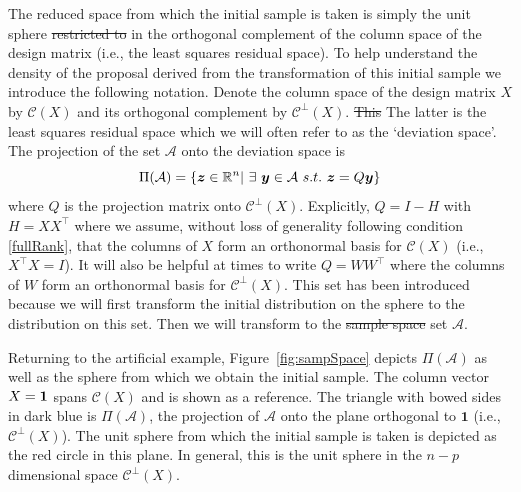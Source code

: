 \documentclass[12pt]{article}
\newcommand{\by}{\mbox{\boldmath $y$}}
\newcommand{\bz}{\mbox{\boldmath $z$}}
\newcommand{\mb}{\mathbf}
\newcommand{\mc}{\mathcal}
\newcommand{\green}[1]{{\color{green}#1}}
\begin{document}
The reduced space from which the initial sample is taken is simply the
unit sphere \green{\sout{restricted to} in} the orthogonal complement of the column space of the design matrix (i.e., the least squares residual space). To help understand the density of the proposal derived from the transformation of this initial sample we introduce the following notation. Denote the column space of the design matrix $X$ by $\mathcal{C}(X)$ and its orthogonal complement by $\mc{C}^\perp(X)$. 
\green{\sout{This} The latter} is the least squares residual space which we will often refer to as the `deviation space'.  The projection of the set $\mathcal{A}$ onto the deviation space is 
\begin{equation}
\label{sampleSpacePerp}
\Pi(\mathcal{A})=\{\bz\in \mathbb{R}^n |\ \exists\ \by\in \mathcal{A}\
s.t.\ \bz=Q \by \}
\end{equation} 
where $Q$ is the projection matrix onto  $\mc{C}^\perp(X)$. Explicitly, $Q=I-H$ with $H=XX^\top$ where we assume, without
loss of generality following condition \ref{fullRank},  that the
columns of $X$ form an orthonormal basis for $\mc{C}(X)$
(i.e., $X^\top X=I$). It will also be helpful at times to write $Q=WW^{\top}$ where the columns of $W$ form an orthonormal basis for $\mc{C}^\perp(X)$. This set has been introduced because we will first transform the initial distribution on the sphere to the distribution on this set. Then we will transform to the \green{\sout{sample space} set} $\mc A$.

Returning to the artificial example, Figure~\ref{fig:sampSpace}
depicts $\Pi(\mathcal{A})$ as well as the sphere from which we obtain
the initial sample. The column vector $X=\bf{1}$ spans $\mc{C}(X)$ and
is shown as a reference. The triangle with bowed sides in dark
  blue is  $\Pi(\mathcal{A})$, the projection of $\mc A$ onto the
plane orthogonal to $\mb 1$ (i.e., $\mc{C}^\perp(X)$). The \green{unit} sphere from
which the initial sample is taken is depicted as the red circle in this plane.  In general, this is the unit sphere in the $n-p$ dimensional space $\mc{C}^\perp(X)$.  
\end{document}
